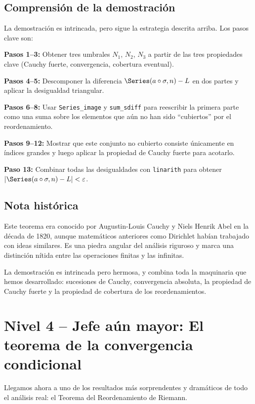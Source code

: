 \subsection{Comprensión de la demostración}

La demostración es intrincada, pero sigue la estrategia descrita arriba. Los pasos clave son:

\textbf{Pasos 1--3:} Obtener tres umbrales $N_1$, $N_2$, $N_3$ a partir de las tres propiedades clave (Cauchy fuerte, convergencia, cobertura eventual).

\textbf{Pasos 4--5:} Descomponer la diferencia $\Series(a \circ \sigma, n) - L$ en dos partes y aplicar la desigualdad triangular.

\textbf{Pasos 6--8:} Usar \texttt{Series\_image} y \texttt{sum\_sdiff} para reescribir la primera parte como una suma sobre los elementos que aún no han sido ``cubiertos'' por el reordenamiento.

\textbf{Pasos 9--12:} Mostrar que este conjunto no cubierto consiste únicamente en índices grandes y luego aplicar la propiedad de Cauchy fuerte para acotarlo.

\textbf{Paso 13:} Combinar todas las desigualdades con \texttt{linarith} para obtener $|\Series(a \circ \sigma, n) - L| < \varepsilon$.

\subsection{Nota histórica}

Este teorema era conocido por Augustin-Louis Cauchy y Niels Henrik Abel en la década de 1820, aunque matemáticos anteriores como Dirichlet habían trabajado con ideas similares. Es una piedra angular del análisis riguroso y marca una distinción nítida entre las operaciones finitas y las infinitas.

La demostración es intrincada pero hermosa, y combina toda la maquinaria que hemos desarrollado: sucesiones de Cauchy, convergencia absoluta, la propiedad de Cauchy fuerte y la propiedad de cobertura de los reordenamientos.

\section{Nivel 4 -- Jefe aún mayor: El teorema de la convergencia condicional}

Llegamos ahora a uno de los resultados más sorprendentes y dramáticos de todo el análisis real: el Teorema del Reordenamiento de Riemann.


